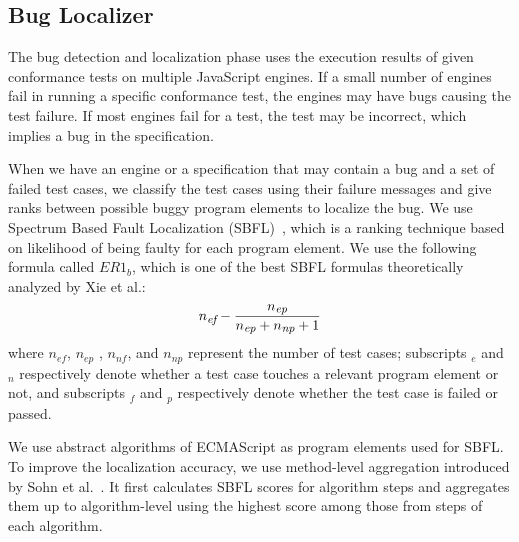 \subsection{Bug Localizer}

The bug detection and localization phase uses the execution results of
given conformance tests on multiple JavaScript engines.
If a small number of engines fail in running a specific conformance test,
the engines may have bugs causing the test failure.
If most engines fail for a test, the test may be incorrect,
which implies a bug in the specification.

When we have an engine or a specification that may contain a bug and
a set of failed test cases, we classify the test cases using their failure
messages and give ranks between possible buggy program elements to localize the bug.
We use Spectrum Based Fault Localization (SBFL)~\cite{sbfl-survey},
which is a ranking technique based on likelihood of being faulty for each
program element.  We use the following formula called $ER1_b$,
which is one of the best SBFL formulas theoretically analyzed by Xie et al.\cite{er1b}:
\[
  {n_{\mbox{\emph{\scriptsize ef}}}} -
  {
    {n_{\mbox{\emph{\scriptsize ep}}}}
    \over
    {n_{\mbox{\emph{\scriptsize ep}}} + n_{\mbox{\emph{\scriptsize np}}} + 1}
  }
\]
where $n_{ef}$, $n_{ep}$ , $n_{nf}$, and $n_{np}$ represent the number of test
cases; subscripts ${}_e$ and ${}_n$ respectively denote whether a test case touches a
relevant program element or not, and subscripts ${}_f$ and ${}_p$
respectively denote whether the test case is failed or passed.

We use abstract algorithms of ECMAScript as program elements used for SBFL.  To
improve the localization accuracy, we use method-level aggregation introduced
by Sohn et al.~\cite{fluccs}.  It first calculates SBFL scores for algorithm
steps and aggregates them up to algorithm-level using the highest score among
those from steps of each algorithm.
